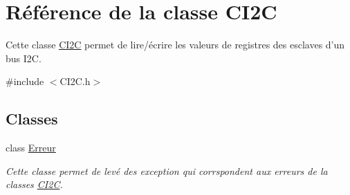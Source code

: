 \hypertarget{class_c_i2_c}{\section{Référence de la classe C\+I2\+C}
\label{class_c_i2_c}
}


Cette classe \hyperlink{class_c_i2_c}{C\+I2\+C} permet de lire/écrire les valeurs de registres des esclaves d'un bus I2\+C.  




{\ttfamily \#include $<$C\+I2\+C.\+h$>$}

\subsection*{Classes}
\begin{DoxyCompactItemize}
\item 
class \hyperlink{class_c_i2_c_1_1_erreur}{Erreur}
\begin{DoxyCompactList}\small\item\em Cette classe permet de levé des exception qui corrspondent aux erreurs de la classes \hyperlink{class_c_i2_c}{C\+I2\+C}. \end{DoxyCompactList}\end{DoxyCompactItemize}
